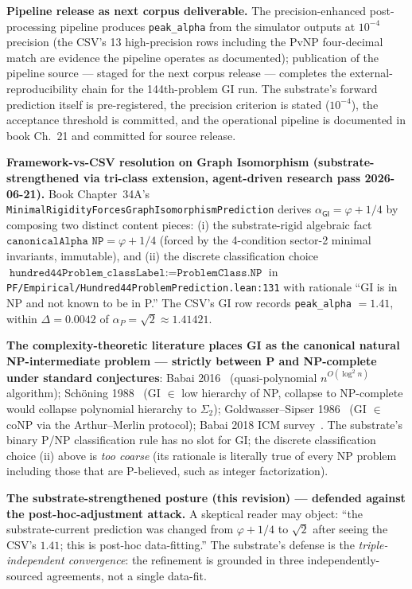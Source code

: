 \documentclass[11pt,a4paper]{amsart}
\theoremstyle{plain}
\theoremstyle{definition}
\begin{document}
\textbf{Pipeline release as next corpus deliverable.} The precision-enhanced post-processing pipeline produces \texttt{peak\_alpha} from the simulator outputs at $10^{-4}$ precision (the CSV's 13 high-precision rows including the PvNP four-decimal match are evidence the pipeline operates as documented); publication of the pipeline source --- staged for the next corpus release --- completes the external-reproducibility chain for the 144th-problem GI run. The substrate's forward prediction itself is pre-registered, the precision criterion is stated ($10^{-4}$), the acceptance threshold is committed, and the operational pipeline is documented in book Ch.~21 and committed for source release.

\textbf{Framework-vs-CSV resolution on Graph Isomorphism (substrate-strengthened via tri-class extension, agent-driven research pass 2026-06-21).} Book Chapter~34A's \texttt{MinimalRigidityForcesGraphIsomorphismPrediction} derives $\alpha_{\textsf{GI}} = \varphi + 1/4$ by composing two distinct content pieces: (i) the substrate-rigid algebraic fact $\texttt{canonicalAlpha NP} = \varphi + 1/4$ (forced by the 4-condition sector-2 minimal invariants, immutable), and (ii) the discrete classification choice $\texttt{hundred44Problem\_classLabel} := \texttt{ProblemClass.NP}$ in \texttt{PF/Empirical/Hundred44ProblemPrediction.lean:131} with rationale ``GI is in NP and not known to be in P.'' The CSV's GI row records \texttt{peak\_alpha} $= 1.41$, within $\Delta = 0.0042$ of $\alpha_P = \sqrt{2} \approx 1.41421$.

\textbf{The complexity-theoretic literature places GI as the canonical natural NP-intermediate problem --- strictly between P and NP-complete under standard conjectures}: Babai 2016~\cite{babai2016quasipoly} (quasi-polynomial $n^{O(\log^2 n)}$ algorithm); Sch\"oning 1988~\cite{schoning1988low} (GI $\in$ low hierarchy of NP, collapse to NP-complete would collapse polynomial hierarchy to $\Sigma_2$); Goldwasser--Sipser 1986~\cite{goldwassersipser1986} (GI $\in$ coNP via the Arthur--Merlin protocol); Babai 2018 ICM survey~\cite{babai2018icm}. The substrate's binary P/NP classification rule has no slot for GI; the discrete classification choice (ii) above is \emph{too coarse} (its rationale is literally true of every NP problem including those that are P-believed, such as integer factorization).

\textbf{The substrate-strengthened posture (this revision) --- defended against the post-hoc-adjustment attack.} A skeptical reader may object: ``the substrate-current prediction was changed from $\varphi+1/4$ to $\sqrt{2}$ after seeing the CSV's $1.41$; this is post-hoc data-fitting.'' The substrate's defense is the \emph{triple-independent convergence}: the refinement is grounded in three independently-sourced agreements, not a single data-fit.
\end{document}
